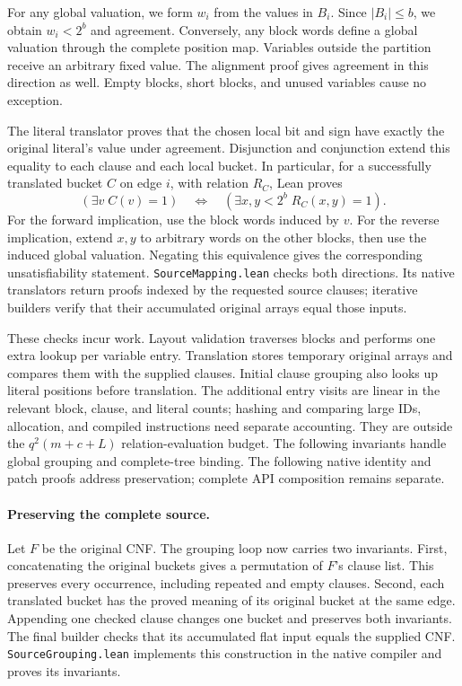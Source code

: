 \documentclass[11pt,a4paper]{article}
\numberwithin{equation}{section}
\theoremstyle{plain}
\theoremstyle{definition}
\theoremstyle{remark}
\begin{document}
For any global valuation, we form $w_i$ from the values in $B_i$. Since $|B_i|\leq b$, we obtain $w_i<2^b$ and agreement. Conversely, any block words define a global valuation through the complete position map. Variables outside the partition receive an arbitrary fixed value. The alignment proof gives agreement in this direction as well. Empty blocks, short blocks, and unused variables cause no exception.

The literal translator proves that the chosen local bit and sign have exactly the original literal's value under agreement. Disjunction and conjunction extend this equality to each clause and each local bucket. In particular, for a successfully translated bucket $C$ on edge $i$, with relation $R_C$, Lean proves
\[
(\exists v\; C(v)=1)
\quad\Longleftrightarrow\quad
(\exists x,y<2^b\; R_C(x,y)=1).
\]
For the forward implication, use the block words induced by $v$. For the reverse implication, extend $x,y$ to arbitrary words on the other blocks, then use the induced global valuation. Negating this equivalence gives the corresponding unsatisfiability statement. \texttt{SourceMapping.lean} checks both directions. Its native translators return proofs indexed by the requested source clauses; iterative builders verify that their accumulated original arrays equal those inputs.

These checks incur work. Layout validation traverses blocks and performs one extra lookup per variable entry. Translation stores temporary original arrays and compares them with the supplied clauses. Initial clause grouping also looks up literal positions before translation. The additional entry visits are linear in the relevant block, clause, and literal counts; hashing and comparing large IDs, allocation, and compiled instructions need separate accounting. They are outside the $q^2(m+c+L)$ relation-evaluation budget. The following invariants handle global grouping and complete-tree binding. The following native identity and patch proofs address preservation; complete API composition remains separate.

\paragraph{Preserving the complete source.}
Let $F$ be the original CNF. The grouping loop now carries two invariants. First, concatenating the original buckets gives a permutation of $F$'s clause list. This preserves every occurrence, including repeated and empty clauses. Second, each translated bucket has the proved meaning of its original bucket at the same edge. Appending one checked clause changes one bucket and preserves both invariants. The final builder checks that its accumulated flat input equals the supplied CNF. \texttt{SourceGrouping.lean} implements this construction in the native compiler and proves its invariants.
\end{document}
